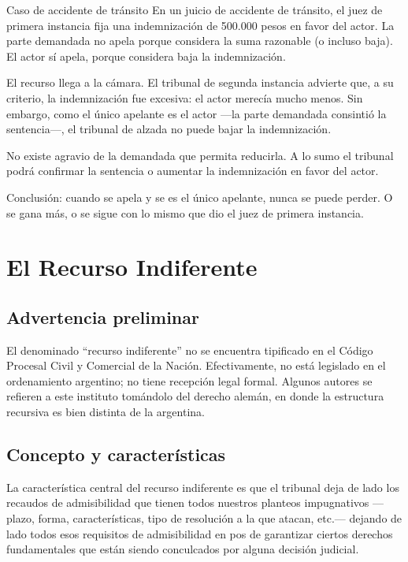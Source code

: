 \documentclass[12pt,oneside]{book}
\begin{document}
\begin{example}{Caso de accidente de tránsito}
En un juicio de accidente de tránsito, el juez de primera instancia fija una indemnización de 500.000 pesos en favor del actor. La parte demandada no apela porque considera la suma razonable (o incluso baja). El actor sí apela, porque considera baja la indemnización.

El recurso llega a la cámara. El tribunal de segunda instancia advierte que, a su criterio, la indemnización fue excesiva: el actor merecía mucho menos. Sin embargo, como el único apelante es el actor ---la parte demandada consintió la sentencia---, el tribunal de alzada no puede bajar la indemnización.

No existe agravio de la demandada que permita reducirla. A lo sumo el tribunal podrá confirmar la sentencia o aumentar la indemnización en favor del actor.

Conclusión: cuando se apela y se es el único apelante, nunca se puede perder. O se gana más, o se sigue con lo mismo que dio el juez de primera instancia.
\end{example}


\chapter{El Recurso Indiferente}

\section{Advertencia preliminar}

El denominado ``recurso indiferente'' no se encuentra tipificado en el Código Procesal Civil y Comercial de la Nación. Efectivamente, no está legislado en el ordenamiento argentino; no tiene recepción legal formal. Algunos autores se refieren a este instituto tomándolo del derecho alemán, en donde la estructura recursiva es bien distinta de la argentina.

\section{Concepto y características}

La característica central del recurso indiferente es que el tribunal deja de lado los recaudos de admisibilidad que tienen todos nuestros planteos impugnativos ---plazo, forma, características, tipo de resolución a la que atacan, etc.--- dejando de lado todos esos requisitos de admisibilidad en pos de garantizar ciertos derechos fundamentales que están siendo conculcados por alguna decisión judicial.
\end{document}
